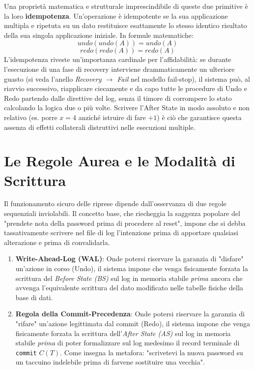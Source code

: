 Una proprietà matematica e strutturale imprescindibile di queste due primitive è la loro \textbf{idempotenza}. Un'operazione è idempotente se la sua applicazione multipla e ripetuta su un dato restituisce esattamente lo stesso identico risultato della sua singola applicazione iniziale. In formule matematiche:
$$undo(undo(A))=undo(A)$$
$$redo(redo(A))=redo(A)$$
L'idempotenza riveste un'importanza cardinale per l'affidabilità: se durante l'esecuzione di una fase di recovery interviene drammaticamente un ulteriore guasto (si veda l'anello \textit{Recovery $\rightarrow$ Fail} nel modello fail-stop), il sistema può, al riavvio successivo, riapplicare ciecamente e da capo tutte le procedure di Undo e Redo partendo dalle direttive del log, senza il timore di corrompere lo stato calcolando la logica due o più volte. Scrivere l'After State in modo assoluto e non relativo (es. porre $x=4$ anziché istruire di fare $+1$) è ciò che garantisce questa assenza di effetti collaterali distruttivi nelle esecuzioni multiple.

\section{Le Regole Aurea e le Modalità di Scrittura}

Il funzionamento sicuro delle riprese dipende dall'osservanza di due regole sequenziali inviolabili. Il concetto base, che riecheggia la saggezza popolare del "prendete nota della password prima di procedere al reset", impone che si debba tassativamente scrivere nel file di log l'intenzione prima di apportare qualsiasi alterazione e prima di convalidarla.

\begin{enumerate}
    \item \textbf{Write-Ahead-Log (WAL)}: Onde potersi riservare la garanzia di "disfare" un'azione in corso (Undo), il sistema impone che venga fisicamente forzata la scrittura del \textit{Before State (BS)} sul log in memoria stabile \textit{prima} ancora che avvenga l'equivalente scrittura del dato modificato nelle tabelle fisiche della base di dati.
    \item \textbf{Regola della Commit-Precedenza}: Onde potersi riservare la garanzia di "rifare" un'azione legittimata dal commit (Redo), il sistema impone che venga fisicamente forzata la scrittura dell'\textit{After State (AS)} sul log in memoria stabile \textit{prima} di poter formalizzare sul log medesimo il record terminale di \texttt{commit} $C(T)$. Come insegna la metafora: "scrivetevi la nuova password su un taccuino indelebile prima di farvene sostituire una vecchia".
\end{enumerate}

